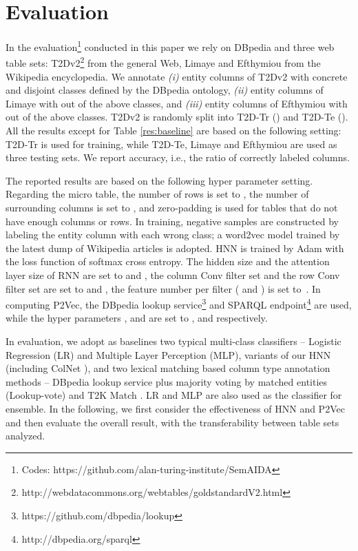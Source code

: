 \documentclass{article}
\begin{document}
\section{Evaluation}\label{sec:experiment_settings}
In the evaluation\footnote{Codes: https://github.com/alan-turing-institute/SemAIDA} conducted in this paper we rely on DBpedia and three web table sets: T2Dv2\footnote{http://webdatacommons.org/webtables/goldstandardV2.html} from the general Web, Limaye \cite{limaye2010annotating} and Efthymiou \cite{efthymiou2017matching} from the Wikipedia encyclopedia.
We annotate \textit{(i)}  entity columns of T2Dv2 with  concrete and disjoint classes defined by the DBpedia ontology,
\textit{(ii)}  entity columns of Limaye with  out of the above  classes,
and \textit{(iii)}  entity columns of Efthymiou with  out of the above  classes.
T2Dv2 is randomly split into T2D-Tr () and T2D-Te (). 
All the results except for Table \ref{res:baseline} are based on the following setting: 
T2D-Tr is used for training, 
while T2D-Te, Limaye and Efthymiou
are used as three testing sets.
We report accuracy, i.e., the ratio of correctly labeled columns.





The reported results are based on the following hyper parameter setting.
Regarding the micro table, 
the number of rows  is set to ,
the number of surrounding columns  is set to ,
and zero-padding is used for tables that do not have enough columns or rows.
In training, 
negative samples are constructed by labeling the entity column with each wrong class;
a word2vec model \cite{mikolov2013distributed} trained by the latest dump of Wikipedia articles is adopted.
HNN is trained by Adam \cite{kingma2014adam} with the loss function of softmax cross entropy.
The hidden size and the attention layer size of RNN are set to  and ,
the column Conv filter set  and the row Conv filter set  are set to  and ,
the feature number per filter ( and ) is set to~.
In computing P2Vec, the
DBpedia lookup service\footnote{https://github.com/dbpedia/lookup} and SPARQL endpoint\footnote{http://dbpedia.org/sparql} are used,
while the hyper parameters ,  and  are set to ,  and  respectively.


In evaluation, we adopt as baselines two typical multi-class classifiers 
-- Logistic Regression (LR) and Multiple Layer Perception (MLP),
variants of our HNN (including ColNet \cite{chen2019colnet}), 
and two lexical matching based column type annotation methods --
DBpedia lookup service plus majority voting by matched entities \cite{zwicklbauer2013towards} (Lookup-vote) and T2K Match \cite{ritze2015matching}.
LR and MLP are also used as the classifier for ensemble.
In the following, we first consider the effectiveness of HNN and P2Vec
and then evaluate the overall result,
with the transferability between table sets analyzed.
\end{document}
